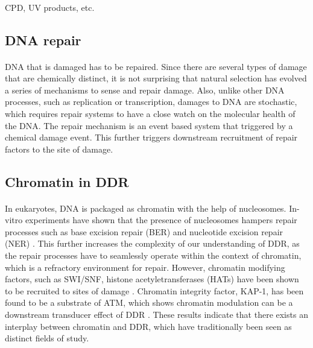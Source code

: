 \paragraph*{} CPD, UV products, etc.

\subsection{DNA repair}
\paragraph*{} DNA that is damaged has to be repaired. Since there are several types of damage that are chemically distinct, it is not surprising that natural selection has evolved a series of mechanisms to sense and repair damage. Also, unlike other DNA processes, such as replication or transcription, damages to DNA are stochastic, which requires repair systems to have a close watch on the molecular health of the DNA. The repair mechanism is an event based system that triggered by a chemical damage event. This further triggers downstream recruitment of repair factors to the site of damage.

\subsection{Chromatin in DDR}
\paragraph*{} In eukaryotes, DNA is packaged as chromatin with the help of nucleosomes. In-vitro experiments have shown that the presence of nucleosomes hampers repair processes such as base excision repair (BER) and nucleotide excision repair (NER) \cite{hara2000dna, odell2011nucleosome}. This further increases the complexity of our understanding of DDR, as the repair processes have to seamlessly operate within the context of chromatin, which is a refractory environment for repair. However, chromatin modifying factors, such as SWI/SNF, histone acetyletransferases (HATs) have been shown to be recruited to sites of damage \cite{park2006mammalian, polo2010regulation}. Chromatin integrity factor, KAP-1, has been found to be a substrate of ATM, which shows chromatin modulation can be a downstream transducer effect of DDR \cite{ziv2006chromatin}. These results indicate that there exists an interplay between chromatin and DDR, which have traditionally been seen as distinct fields of study.

